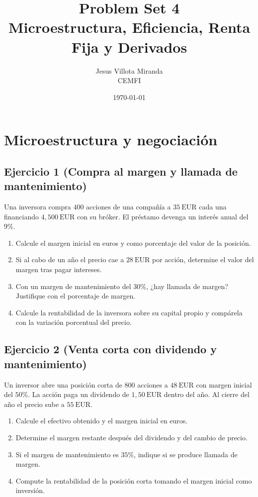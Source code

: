 \documentclass[12pt,a4paper]{article}
\title{\textbf{Problem Set 4}\\\large Microestructura, Eficiencia, Renta Fija y Derivados}
\author{Jesus Villota Miranda\\CEMFI}
\date{\today}
\newcommand{\EUR}[1]{\ensuremath{#1~\text{EUR}}}
\newenvironment{ejercicio}[1]{\subsection*{Ejercicio #1}}{}
\begin{document}

\section{Microestructura y negociación}

\begin{ejercicio}{1 (Compra al margen y llamada de mantenimiento)}
Una inversora compra \(400\) acciones de una compañía a \EUR{35} cada una financiando \EUR{4{,}500} con su bróker. El préstamo devenga un interés anual del \(9\%\).
\begin{enumerate}[label=\alph*)]
  \item Calcule el margen inicial en euros y como porcentaje del valor de la posición.
  \item Si al cabo de un año el precio cae a \EUR{28} por acción, determine el valor del margen tras pagar intereses.
  \item Con un margen de mantenimiento del \(30\%\), ¿hay llamada de margen? Justifique con el porcentaje de margen.
  \item Calcule la rentabilidad de la inversora sobre su capital propio y compárela con la variación porcentual del precio.
\end{enumerate}
\end{ejercicio}

\begin{ejercicio}{2 (Venta corta con dividendo y mantenimiento)}
Un inversor abre una posición corta de \(800\) acciones a \EUR{48} con margen inicial del \(50\%\). La acción paga un dividendo de \EUR{1{,}50} dentro del año. Al cierre del año el precio sube a \EUR{55}.
\begin{enumerate}[label=\alph*)]
  \item Calcule el efectivo obtenido y el margen inicial en euros.
  \item Determine el margen restante después del dividendo y del cambio de precio.
  \item Si el margen de mantenimiento es \(35\%\), indique si se produce llamada de margen.
  \item Compute la rentabilidad de la posición corta tomando el margen inicial como inversión.
\end{enumerate}
\end{ejercicio}
\end{document}
